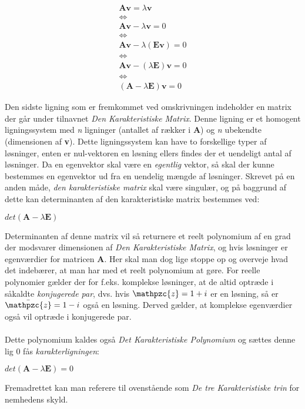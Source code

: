 \documentclass{article}
\newcommand{\cent}[1]{\begin{center}#1\end{center}}
\newcommand{\mat}[1]{\begin{gather*}#1\end{gather*}}
\newcommand{\script}[1]{\mathpzc{#1}}
\begin{document}
	\mat{\textbf{Av} = \lambda \textbf{v} 
		 \\ \Leftrightarrow  \\
		  \textbf{Av} - \lambda \textbf{v} = 0 
		  \\ \Leftrightarrow \\
	  		\textbf{Av} - \lambda (\textbf{Ev}) = 0 \\
	  		\Leftrightarrow \\
  				\textbf{Av} - (\lambda \textbf{E})\textbf{v} = 0 \\ 
  				\Leftrightarrow \\
  					(\textbf{A}-\lambda \textbf{E})\textbf{v}=0}
  	
  	Den sidste ligning som er fremkommet ved omskrivningen indeholder en matrix der går under tilnavnet \textit{Den Karakteristiske Matrix}. Denne ligning er et homogent ligningssystem med \textit{n} ligninger (antallet af rækker i \textbf{A}) og \textit{n} ubekendte (dimensionen af \textbf{v}). Dette ligningssystem kan have to forskellige typer af løsninger, enten er nul-vektoren en løsning ellers findes der et uendeligt antal af løsninger. Da en egenvektor skal være en \textit{egentlig} vektor, så skal der kunne bestemmes en egenvektor ud fra en uendelig mængde af løsninger. Skrevet på en anden måde, \textit{den karakteristiske matrix} skal være singulær, og på baggrund af dette kan determinanten af den karakteristiske matrix bestemmes ved:
  	
  	\cent{$ det(\textbf{A}-\lambda \textbf{E}) $}
  	
  	Determinanten af denne matrix vil så returnere et reelt polynomium af en grad der modsvarer dimensionen af \textit{Den Karakteristiske Matrix}, og hvis løsninger er egenværdier for matricen \textbf{A}. Her skal man dog lige stoppe op og overveje hvad det indebærer, at man har med et reelt polynomium at gøre. For reelle polynomier gælder der for f.eks. komplekse løsninger, at de altid optræde i såkaldte \textit{konjugerede par}, dvs. hvis $  \script{z} =1 + i $ er en løsning, så er $ \bar{\script{z}} =1 - i $ også en løsning. Derved gælder, at komplekse egenværdier også vil optræde i konjugerede par.\\
  	\\
  	Dette polynomium kaldes også \textit{Det Karakteristiske Polynomium} og sættes denne lig 0 fås \textit{karakterligningen}:
  	
  	\cent{$ det(\textbf{A}-\lambda \textbf{E}) = 0 $}
  	
  	Fremadrettet kan man referere til ovenstående som \textit{De tre Karakteristiske trin} for nemhedens skyld.
  	
\end{document}
